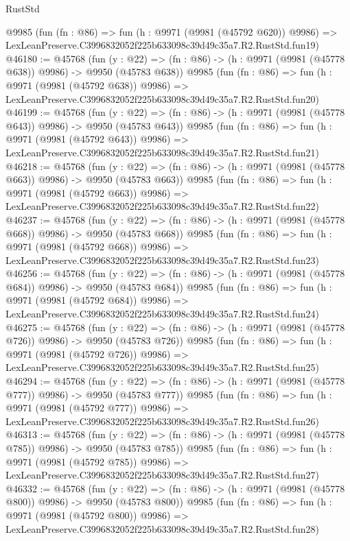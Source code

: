 \begin{lexlean}{RustStd}
\begin{coremodule}
    @9985
    (fun (fn : @86) =>
    fun (h : @9971 (@9981 (@45792 @620)) @9986) =>
    LexLeanPreserve.C3996832052f225b633098c39d49c35a7.R2.RustStd.fun19)
@46180 := @45768
    (fun (y : @22) => (fn : @86) -> (h : @9971 (@9981 (@45778 @638)) @9986) -> @9950 (@45783 @638))
    @9985
    (fun (fn : @86) =>
    fun (h : @9971 (@9981 (@45792 @638)) @9986) =>
    LexLeanPreserve.C3996832052f225b633098c39d49c35a7.R2.RustStd.fun20)
@46199 := @45768
    (fun (y : @22) => (fn : @86) -> (h : @9971 (@9981 (@45778 @643)) @9986) -> @9950 (@45783 @643))
    @9985
    (fun (fn : @86) =>
    fun (h : @9971 (@9981 (@45792 @643)) @9986) =>
    LexLeanPreserve.C3996832052f225b633098c39d49c35a7.R2.RustStd.fun21)
@46218 := @45768
    (fun (y : @22) => (fn : @86) -> (h : @9971 (@9981 (@45778 @663)) @9986) -> @9950 (@45783 @663))
    @9985
    (fun (fn : @86) =>
    fun (h : @9971 (@9981 (@45792 @663)) @9986) =>
    LexLeanPreserve.C3996832052f225b633098c39d49c35a7.R2.RustStd.fun22)
@46237 := @45768
    (fun (y : @22) => (fn : @86) -> (h : @9971 (@9981 (@45778 @668)) @9986) -> @9950 (@45783 @668))
    @9985
    (fun (fn : @86) =>
    fun (h : @9971 (@9981 (@45792 @668)) @9986) =>
    LexLeanPreserve.C3996832052f225b633098c39d49c35a7.R2.RustStd.fun23)
@46256 := @45768
    (fun (y : @22) => (fn : @86) -> (h : @9971 (@9981 (@45778 @684)) @9986) -> @9950 (@45783 @684))
    @9985
    (fun (fn : @86) =>
    fun (h : @9971 (@9981 (@45792 @684)) @9986) =>
    LexLeanPreserve.C3996832052f225b633098c39d49c35a7.R2.RustStd.fun24)
@46275 := @45768
    (fun (y : @22) => (fn : @86) -> (h : @9971 (@9981 (@45778 @726)) @9986) -> @9950 (@45783 @726))
    @9985
    (fun (fn : @86) =>
    fun (h : @9971 (@9981 (@45792 @726)) @9986) =>
    LexLeanPreserve.C3996832052f225b633098c39d49c35a7.R2.RustStd.fun25)
@46294 := @45768
    (fun (y : @22) => (fn : @86) -> (h : @9971 (@9981 (@45778 @777)) @9986) -> @9950 (@45783 @777))
    @9985
    (fun (fn : @86) =>
    fun (h : @9971 (@9981 (@45792 @777)) @9986) =>
    LexLeanPreserve.C3996832052f225b633098c39d49c35a7.R2.RustStd.fun26)
@46313 := @45768
    (fun (y : @22) => (fn : @86) -> (h : @9971 (@9981 (@45778 @785)) @9986) -> @9950 (@45783 @785))
    @9985
    (fun (fn : @86) =>
    fun (h : @9971 (@9981 (@45792 @785)) @9986) =>
    LexLeanPreserve.C3996832052f225b633098c39d49c35a7.R2.RustStd.fun27)
@46332 := @45768
    (fun (y : @22) => (fn : @86) -> (h : @9971 (@9981 (@45778 @800)) @9986) -> @9950 (@45783 @800))
    @9985
    (fun (fn : @86) =>
    fun (h : @9971 (@9981 (@45792 @800)) @9986) =>
    LexLeanPreserve.C3996832052f225b633098c39d49c35a7.R2.RustStd.fun28)

\end{coremodule}
\end{lexlean}
